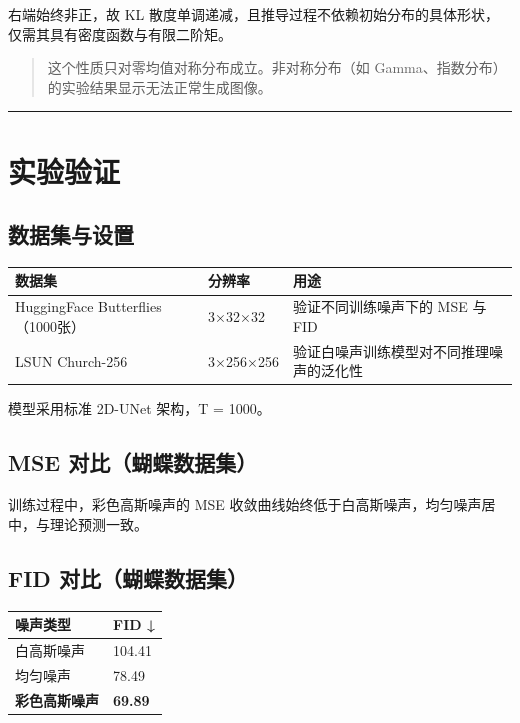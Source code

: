 右端始终非正，故 KL 散度单调递减，且推导过程不依赖初始分布的具体形状，仅需其具有密度函数与有限二阶矩。

\begin{quote}
这个性质只对零均值对称分布成立。非对称分布（如 Gamma、指数分布）的实验结果显示无法正常生成图像。
\end{quote}

\hrule

\section{实验验证}

\subsection{数据集与设置}

\begin{center}
\begin{tabular}{lll}
\toprule
数据集 & 分辨率 & 用途 \\
\midrule
HuggingFace Butterflies（1000张） & 3×32×32 & 验证不同训练噪声下的 MSE 与 FID \\
LSUN Church-256 & 3×256×256 & 验证白噪声训练模型对不同推理噪声的泛化性 \\
\bottomrule
\end{tabular}
\end{center}

模型采用标准 2D-UNet 架构，T = 1000。

\subsection{MSE 对比（蝴蝶数据集）}

训练过程中，彩色高斯噪声的 MSE 收敛曲线始终低于白高斯噪声，均匀噪声居中，与理论预测一致。

\subsection{FID 对比（蝴蝶数据集）}

\begin{center}
\begin{tabular}{ll}
\toprule
噪声类型 & FID ↓ \\
\midrule
白高斯噪声 & 104.41 \\
均匀噪声 & 78.49 \\
\textbf{彩色高斯噪声} & \textbf{69.89} \\
\bottomrule
\end{tabular}
\end{center}

